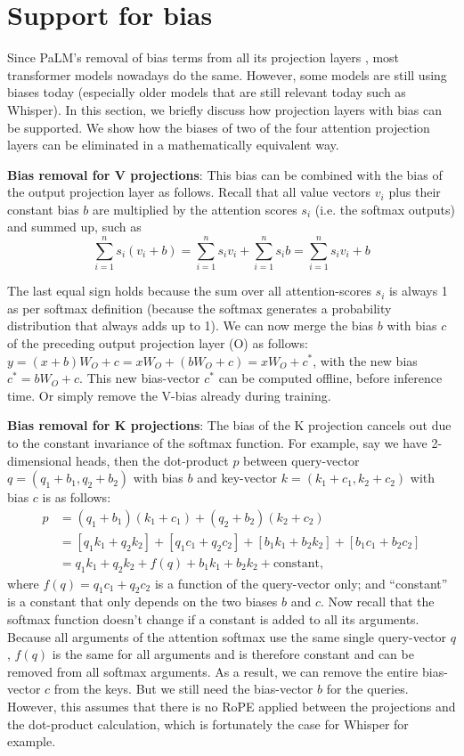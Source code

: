 \documentclass{article}
\begin{document}
\section{Support for bias}
Since PaLM’s removal of bias terms from all its projection layers \citep{PaLM}, most transformer models nowadays do the same. However, some models are still using biases today (especially older models that are still relevant today such as Whisper). In this section, we briefly discuss how projection layers with bias can be supported. We show how the biases of two of the four attention projection layers can be eliminated in a mathematically equivalent way.

\textbf{Bias removal for V projections}: This bias can be combined with the bias of the output projection layer as follows. Recall that all value vectors $v_i$ plus their constant bias $b$ are multiplied by the attention scores $s_i$ (i.e. the softmax outputs) and summed up, such as
\begin{equation*}
  \sum_{i=1}^n s_i (v_i + b) = \sum_{i=1}^n s_i v_i + \sum_{i=1}^n s_i b = \sum_{i=1}^n s_i v_i + b
\end{equation*}

The last equal sign holds because the sum over all attention-scores $s_i$ is always 1 as per softmax definition (because the softmax generates a probability distribution that always adds up to 1). We can now merge the bias $b$ with bias $c$ of the preceding output projection layer (O) as follows: $y = (x + b) W_O + c = x W_O + (b W_O + c) = x W_O + c^\ast$, with the new bias $c^\ast = b W_O + c$. This new bias-vector $c^\ast$ can be computed offline, before inference time. Or simply remove the V-bias already during training.

\textbf{Bias removal for K projections}: The bias of the K projection cancels out due to the constant invariance of the softmax function. For example, say we have 2-dimensional heads, then the dot-product $p$ between query-vector $q = (q_1 + b_1, q_2 + b_2)$ with bias $b$ and key-vector $k = (k_1 + c_1, k_2 + c_2)$ with bias $c$ is as follows:
\begin{align*}
  p &= (q_1 + b_1)(k_1 + c_1) + (q_2 + b_2)(k_2 + c_2) \\
    &= [q_1k_1 + q_2k_2] + [q_1c_1 + q_2c_2] + [b_1k_1 + b_2k_2] + [b_1c_1 + b_2c_2] \\
    &= q_1k_1 + q_2k_2 + f(q) + b_1k_1 + b_2k_2 + \text{constant},
\end{align*}
where $f(q) = q_1c_1 + q_2c_2$ is a function of the query-vector only; and “constant” is a constant that only depends on the two biases $b$ and $c$. Now recall that the softmax function doesn’t change if a constant is added to all its arguments. Because all arguments of the attention softmax use the same single query-vector $q$, $f(q)$ is the same for all arguments and is therefore constant and can be removed from all softmax arguments. As a result, we can remove the entire bias-vector $c$ from the keys. But we still need the bias-vector $b$ for the queries. However, this assumes that there is no RoPE applied between the projections and the dot-product calculation, which is fortunately the case for Whisper for example.
\end{document}
